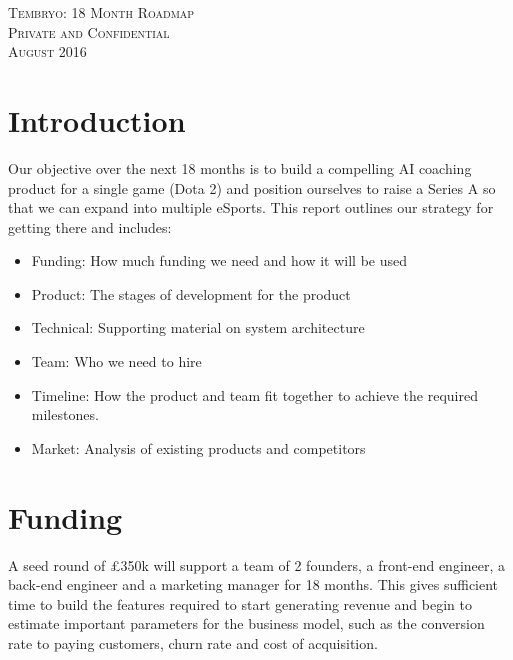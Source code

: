 \documentclass[12pt]{article} %
\let\oldsection\section
\renewcommand\section{\clearpage\oldsection}
\begin{document}
\begin{titlepage}


    \centering

    \vspace*{4cm}
  {\scshape\huge Tembryo: 18 Month Roadmap}\\
  
\vspace*{\fill}
	 {\scshape\huge\Large Private and Confidential\\
	 August 2016}

\end{titlepage}


\tableofcontents{}


\doublespacing
\setlength{\parindent}{0pt}
\setlength{\parskip}{0.7\baselineskip}%

\section{Introduction}

Our objective over the next 18 months is to build a compelling AI coaching product for a single game (Dota 2) and position ourselves to raise a Series A so that we can expand into multiple eSports. This report outlines our strategy for getting there and includes:
\begin{itemize}  
\item Funding: How much funding we need and how it will be used
\item Product: The stages of development for the product 
\item Technical: Supporting material on system architecture
\item Team: Who we need to hire
\item Timeline: How the product and team fit together to achieve the required milestones.
\item Market: Analysis of existing products and competitors
\end{itemize}

\section{Funding}

A seed round of \pounds350k will support a team of 2 founders, a front-end engineer, a back-end engineer and a marketing manager for 18 months. This gives sufficient time to build the features required to start generating revenue and begin to estimate important parameters for the business model, such as the conversion rate to paying customers, churn rate and cost of acquisition.
\end{document}
